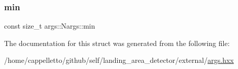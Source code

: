 \subsubsection{\texorpdfstring{min}{min}}
{\footnotesize\ttfamily const size\+\_\+t args\+::\+Nargs\+::min}



The documentation for this struct was generated from the following file\+:\begin{DoxyCompactItemize}
\item 
/home/cappelletto/github/self/landing\+\_\+area\+\_\+detector/external/\hyperlink{args_8hxx}{args.\+hxx}\end{DoxyCompactItemize}

